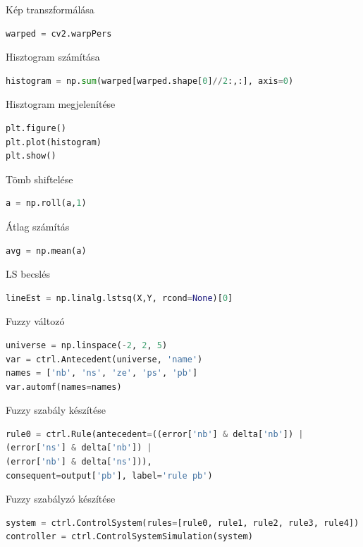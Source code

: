 \documentclass[12pt,a4paper,oneside]{report}             %
\begin{document}
Kép transzformálása

\begin{lstlisting}[language=Python]
warped = cv2.warpPers
\end{lstlisting}

Hisztogram számítása

\begin{lstlisting}[language=Python]
histogram = np.sum(warped[warped.shape[0]//2:,:], axis=0)
\end{lstlisting}

Hisztogram megjelenítése

\begin{lstlisting}[language=Python]
plt.figure()
plt.plot(histogram)
plt.show()
\end{lstlisting}

Tömb shiftelése

\begin{lstlisting}[language=Python]
a = np.roll(a,1)
\end{lstlisting}

Átlag számítás

\begin{lstlisting}[language=Python]
avg = np.mean(a)
\end{lstlisting}

LS becslés

\begin{lstlisting}[language=Python]
lineEst = np.linalg.lstsq(X,Y, rcond=None)[0]
\end{lstlisting}

Fuzzy változó

\begin{lstlisting}[language=Python]
universe = np.linspace(-2, 2, 5)
var = ctrl.Antecedent(universe, 'name')
names = ['nb', 'ns', 'ze', 'ps', 'pb']
var.automf(names=names)
\end{lstlisting}

Fuzzy szabály készítése

\begin{lstlisting}[language=Python]
rule0 = ctrl.Rule(antecedent=((error['nb'] & delta['nb']) |
(error['ns'] & delta['nb']) |
(error['nb'] & delta['ns'])),
consequent=output['pb'], label='rule pb')
\end{lstlisting}

Fuzzy szabályzó készítése

\begin{lstlisting}[language=Python]
system = ctrl.ControlSystem(rules=[rule0, rule1, rule2, rule3, rule4])
controller = ctrl.ControlSystemSimulation(system)
\end{lstlisting}
\end{document}
